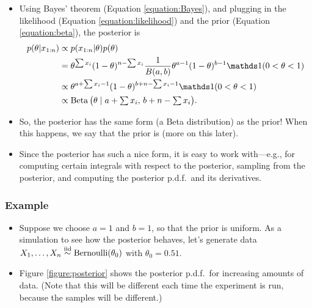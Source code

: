 \documentclass[12pt]{article}
\begin{document}
\begin{itemize}
\item Using Bayes' theorem (Equation \ref{equation:Bayes}), and plugging in the likelihood (Equation \ref{equation:likelihood}) and the prior (Equation \ref{equation:beta}), the posterior is
\begin{align}
p(\theta|x_{1:n}) &\propto p(x_{1:n}|\theta) p(\theta)\notag\\
& =\theta^{\sum x_i}(1-\theta)^{n-\sum x_i}\frac{1}{B(a,b)}\theta^{a-1}(1-\theta)^{b-1}\I(0<\theta<1) \notag\\
& \propto \theta^{a +\sum x_i - 1}(1-\theta)^{b +n-\sum x_i - 1}\I(0<\theta<1)\notag\\
& \propto \textstyle\Beta\big(\theta\mid a +\sum x_i, \, b + n-\sum x_i\big).
\label{equation:Beta-Bernoulli-posterior}
\end{align}
\item So, the posterior has the same form (a Beta distribution) as the prior! When this happens, we say that the prior is  (more on this later).
\item Since the posterior has such a nice form, it is easy to work with---e.g., for computing certain integrals with respect to the posterior, sampling from the posterior, and computing the posterior p.d.f.\ and its derivatives.
\end{itemize}

\subsubsection*{Example}
\begin{itemize}
\item Suppose we choose $a = 1$ and $b = 1$, so that the prior is uniform.  As a simulation to see how the posterior behaves, let's generate data $X_1,\dotsc,X_n\stackrel{\mathrm{iid}}{\sim}\operatorname*{Bernoulli}(\theta_0)$ with $\theta_0 = 0.51$.
\item Figure \ref{figure:posterior} shows the posterior p.d.f.\ for increasing amounts of data. (Note that this will be different each time the experiment is run, because the samples will be different.)
\end{itemize}
\end{document}
